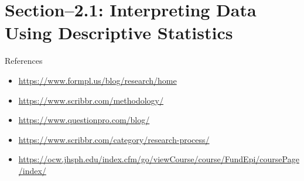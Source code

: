 


\maketitle
\section{Section--2.1: Interpreting Data Using Descriptive Statistics}



%  
% 
% 


\begin{frame}[t]{References}
	\begin{itemize}
		\item \url{https://www.formpl.us/blog/research/home}
		\item \url{https://www.scribbr.com/methodology/}
		\item \url{https://www.questionpro.com/blog/}
		\item \url{https://www.scribbr.com/category/research-process/}
		\item 
		\url{https://ocw.jhsph.edu/index.cfm/go/viewCourse/course/FundEpi/coursePage/index/}
	\end{itemize}
\end{frame}

